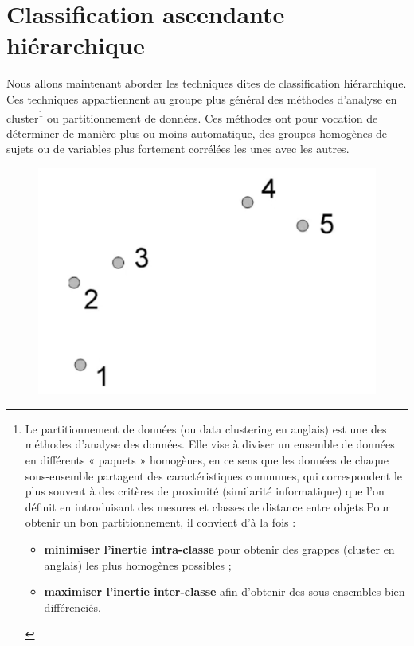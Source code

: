 \newpage



\section{Classification ascendante hiérarchique}
Nous allons maintenant aborder les techniques dites de classification hiérarchique. Ces techniques appartiennent au groupe plus général des méthodes d'analyse en cluster\footnote{Le partitionnement de données (ou data clustering en anglais) est une des méthodes d'analyse des données. Elle vise à diviser un ensemble de données en différents « paquets » homogènes, en ce sens que les données de chaque sous-ensemble partagent des caractéristiques communes, qui correspondent le plus souvent à des critères de proximité (similarité informatique) que l'on définit en introduisant des mesures et classes de distance entre objets.\newline Pour obtenir un bon partitionnement, il convient d'à la fois :\begin{itemize}\item \textbf{minimiser l'inertie intra-classe} pour obtenir des grappes (cluster en anglais) les plus homogènes possibles ;\item \textbf{maximiser l'inertie inter-classe} afin d'obtenir des sous-ensembles bien différenciés.\end{itemize}} ou partitionnement de données. Ces méthodes ont pour vocation de déterminer de manière plus ou moins automatique, des groupes homogènes de sujets ou de variables plus fortement corrélées les unes avec les autres.\newline

\begin{figure}[H]\begin{center}\includegraphics[scale=0.5]{ilu/ClassHierarpts.png}\end{center}\end{figure}

